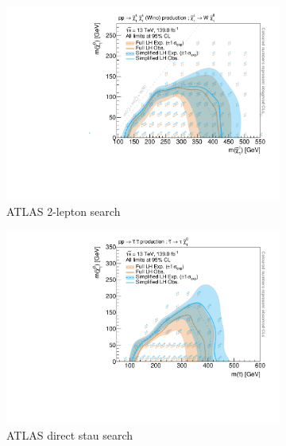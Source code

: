 \begin{figure}
\begin{subfigure}[b]{0.5\textwidth}
		\centering\includegraphics[width=\textwidth]{exclusion_2L0J_CLs_noLabel_v2}
		\caption{ATLAS 2-lepton search~\cite{SUSY-2018-32}\label{fig:results_2L0J_CLs}}
	\end{subfigure}\hfill
	\begin{subfigure}[b]{0.5\textwidth}
		\centering\includegraphics[width=\textwidth]{exclusion_directstaus_CLs_noLabel_v2}
		\caption{ATLAS direct stau search~\cite{SUSY-2018-04}\label{fig:results_directstaus_CLs}}
	\end{subfigure}\hfill
	\par\medskip
	\par\medskip
	\begin{subfigure}[b]{0.5\textwidth}

\end{subfigure}
\end{figure}
